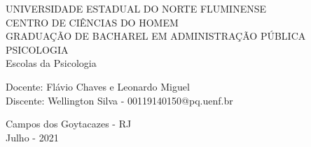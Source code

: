 \begin{center}
    {\large UNIVERSIDADE ESTADUAL DO NORTE FLUMINENSE}
    \\[0.2cm]
    {\large CENTRO DE CIÊNCIAS DO HOMEM}
    \\[0.2cm]
    {\large GRADUAÇÃO DE BACHAREL EM ADMINISTRAÇÃO PÚBLICA}
    \\[0.2cm]
    {\large PSICOLOGIA}
    \\[8cm]
    { \huge Escolas da Psicologia}
    \\[4cm]
\end{center}

\begin{flushleft}
    Docente: Flávio Chaves e Leonardo Miguel\\[.2cm]
    Discente: Wellington Silva - 00119140150@pq.uenf.br \\[4cm]
\end{flushleft}

\begin{center}
    {\large Campos dos Goytacazes - RJ}\\[0.2cm]
    {\large Julho - 2021}
\end{center}